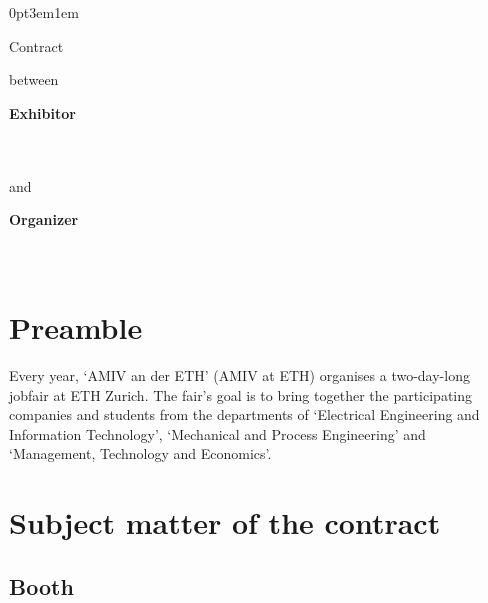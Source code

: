 \titlespacing*{\section}
{0pt}{3em}{1em}

\renewcommand*{\thesection}{\S\ \arabic{section}}

\begin{center}
\amivfairtitle
\bigbreak
\begin{huge}
Contract
\end{huge}
\medbreak
between
\bigbreak
\end{center}

\vspace{2cm}

\begin{minipage}[t]{0.4\textwidth}
\textbf{Exhibitor}
\bigbreak
\companyname\\
\companyaddress\\
\companycity\\
\companycountry
\end{minipage}%
\begin{minipage}[t]{0.2\textwidth}
and
\end{minipage}%
\begin{minipage}[t]{0.4\textwidth}
\textbf{Organizer}
\bigbreak
\amivname\\
\amivaddress\\
\amivpostal\ \amivcity
\end{minipage}

\vfill
\section*{Preamble}

Every year, `AMIV an der ETH' (AMIV at ETH) organises a two-day-long jobfair at ETH
Zurich. The fair's goal is to bring together the participating companies and students
from the departments of `Electrical Engineering and Information Technology',
`Mechanical and Process Engineering' and `Management, Technology and Economics'.

\newpage
\section{Subject matter of the contract}
\subsection{Booth}

